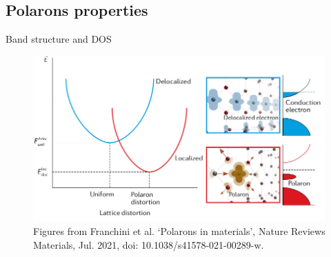 \documentclass[11pt, xcolor=dvipsnames, aspectratio=43]{beamer}
\begin{document}
\subsection{Polarons properties}
\begin{frame}{Band structure and DOS}
    \begin{figure}
        \centering
        \includegraphics[height=0.7\textheight]{figures/polaron_bands.png}
        \caption{Figures from Franchini et al. ‘Polarons in materials’, Nature Reviews Materials, Jul. 2021, doi: 10.1038/s41578-021-00289-w.
        }
    \end{figure}
\end{frame}


\end{document}
